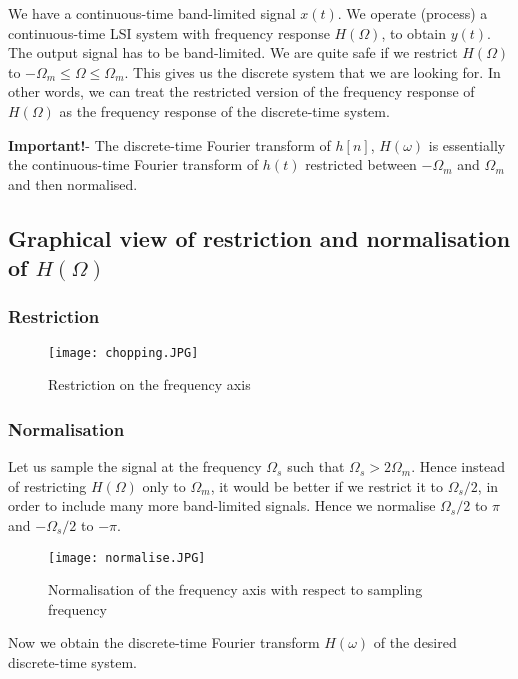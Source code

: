 We have a continuous-time band-limited signal $x(t)$. We operate (process) a continuous-time LSI system with frequency response $H(\Omega)$, to obtain $y(t)$. The output signal has to be band-limited. We are quite safe if we restrict $H(\Omega)$ to $-\Omega_{m} \leq \Omega \leq \Omega_{m}$. This gives us the discrete system that we are looking for. In other words, we can treat the restricted version of the frequency response of $H(\Omega)$ as the frequency response of the discrete-time system. 

{\bf Important!}- The discrete-time Fourier transform of $h[n]$, $H(\omega)$ is essentially the continuous-time Fourier transform of $h(t)$ restricted between $-\Omega_{m}$ and $\Omega_{m}$ and then normalised. 

\subsection{Graphical view of restriction and normalisation of $H(\Omega)$}
\subsubsection{Restriction}
\begin{figure}[h] 
        \centering
        
                \texttt{[image: chopping.JPG]}
                \caption{Restriction on the frequency axis}
                \label{chopping}
        
\end{figure}

\subsubsection{Normalisation}
Let us sample the signal at the frequency $\Omega_{s}$ such that $\Omega_{s} > 2 \Omega_{m}$. Hence instead of restricting $H(\Omega)$ only to $\Omega_{m}$, it would be better if we restrict it to $\Omega_{s}/2$, in order to include many more band-limited signals. Hence we normalise $\Omega_{s}/2$ to $\pi$ and $-\Omega_{s}/2$ to $-\pi$. 
\begin{figure}[h] 
        \centering
        
                \texttt{[image: normalise.JPG]}
                \caption{Normalisation of the frequency axis with respect to sampling frequency}
                \label{normalise}
        
\end{figure}
Now we obtain the discrete-time Fourier transform $H(\omega)$ of the desired discrete-time system.
\\

